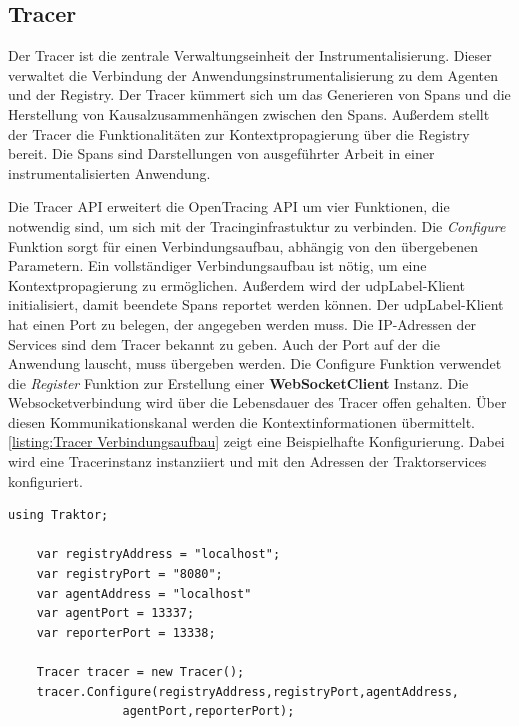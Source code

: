 \subsection{Tracer}
\label{subsection:Tracer}
Der Tracer ist die zentrale Verwaltungseinheit der Instrumentalisierung. Dieser verwaltet die Verbindung der Anwendungsinstrumentalisierung zu dem Agenten und der Registry. Der Tracer kümmert sich um das Generieren von Spans und die Herstellung von Kausalzusammenhängen zwischen den Spans. Außerdem stellt der Tracer die Funktionalitäten zur Kontextpropagierung über die Registry bereit. Die Spans sind Darstellungen von ausgeführter Arbeit in einer instrumentalisierten Anwendung. 

Die Tracer API erweitert die OpenTracing API um vier Funktionen, die notwendig sind, um sich mit der Tracinginfrastuktur zu verbinden. Die \emph{Configure} Funktion sorgt für einen Verbindungsaufbau, abhängig von den übergebenen Parametern. Ein vollständiger Verbindungsaufbau ist nötig, um eine Kontextpropagierung zu ermöglichen. Außerdem wird der \gls{udpLabel}-Klient initialisiert, damit beendete Spans reportet werden können. Der \gls{udpLabel}-Klient hat einen Port zu belegen, der angegeben werden muss. Die IP-Adressen der Services sind dem Tracer bekannt zu geben. Auch der Port auf der die Anwendung lauscht, muss übergeben werden. Die Configure Funktion verwendet die \emph{Register} Funktion zur Erstellung einer \textbf{WebSocketClient} Instanz. Die Websocketverbindung wird über die Lebensdauer des Tracer offen gehalten. Über diesen Kommunikationskanal werden die Kontextinformationen übermittelt. \cref{listing:Tracer Verbindungsaufbau} zeigt eine Beispielhafte Konfigurierung. Dabei wird eine Tracerinstanz instanziiert und mit den Adressen der Traktorservices konfiguriert.

\begin{minipage}[]{\textwidth}
	\begin{lstlisting}[frame=trBL]
	using Traktor;
	
	var registryAddress = "localhost";
	var registryPort = "8080";
	var agentAddress = "localhost"
	var agentPort = 13337;
	var reporterPort = 13338;
	
	Tracer tracer = new Tracer();
	tracer.Configure(registryAddress,registryPort,agentAddress,
				agentPort,reporterPort);
	
	\end{lstlisting}
	\label{listing:Tracer Verbindungsaufbau}
\end{minipage} 

